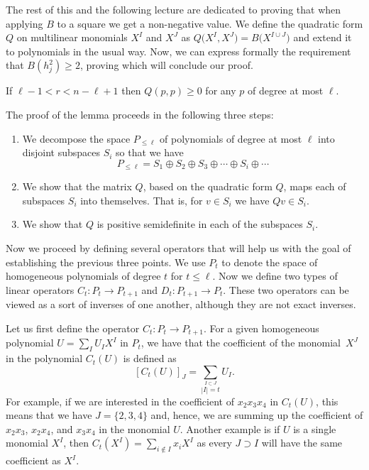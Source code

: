 \documentclass[a4paper,twoside,justified]{tufte-handout}
\begin{document}
The rest of this and the following lecture are dedicated to proving
that when applying $B$ to a square we get a non-negative value. We
define the quadratic form $Q$ on multilinear monomials $X^I$ and $X^J$
as $Q\bigl(X^I, X^J\bigr) = B\bigl(X^{I \cup J}\bigr)$ and extend it
to polynomials in the usual way. Now, we can express formally the
requirement that $B(h_j^2) \geq 2$, proving which will conclude our
proof.

\begin{lemma}
  If $\ell - 1 < r < n - \ell + 1$ then $Q(p, p) \geq 0$ for any $p$
  of degree at most $\ell$.
\end{lemma}

The proof of the lemma proceeds in the following three steps:
\begin{enumerate}
\item We decompose the space $P_{\leq \ell}$ of polynomials of degree
  at most $\ell$ into disjoint subspaces $S_i$ so that we have
  \begin{equation}
    P_{\leq \ell} = S_1 \oplus S_2 \oplus S_3 \oplus \cdots \oplus S_i \oplus \cdots
  \end{equation}
\item We show that the matrix $Q$, based on the quadratic form $Q$,
  maps each of subspaces $S_i$ into themselves. That is, for $v \in
  S_i$ we have $Q v \in S_i$.
\item We show that $Q$ is positive semidefinite in each of the
  subspaces $S_i$.
\end{enumerate}

Now we proceed by defining several operators that will help us with
the goal of establishing the previous three points. We use $P_t$ to
denote the space of homogeneous polynomials of degree $t$ for $t \leq
\ell$. Now we define two types of linear operators $C_t \colon P_t \to
P_{t + 1}$ and $D_t \colon P_{t + 1} \to P_t$. These two operators can
be viewed as a sort of inverses of one another, although they are not
exact inverses.

Let us first define the operator $C_t \colon P_t \to P_{t + 1}$. For a
given homogeneous polynomial $U = \sum_I U_I X^I$ in $P_t$, we have
that the coefficient of the monomial~$X^J$ in the polynomial $C_t(U)$
is defined as
\begin{equation}
  \left[C_t(U)\right]_J = \sum_{\stackrel{I \subset J}{|I| = t}} U_I.
\end{equation}
For example, if we are interested in the coefficient of $x_2 x_3 x_4$
in $C_t(U)$, this means that we have $J = \{2, 3, 4\}$ and, hence, we
are summing up the coefficient of $x_2 x_3$, $x_2 x_4$, and $x_3 x_4$
in the monomial $U$. Another example is if $U$ is a single monomial
$X^I$, then $C_t(X^I) = \sum_{i \notin I} x_i X^I$ as every $J \supset
I$ will have the same coefficient as $X^I$.
\end{document}
